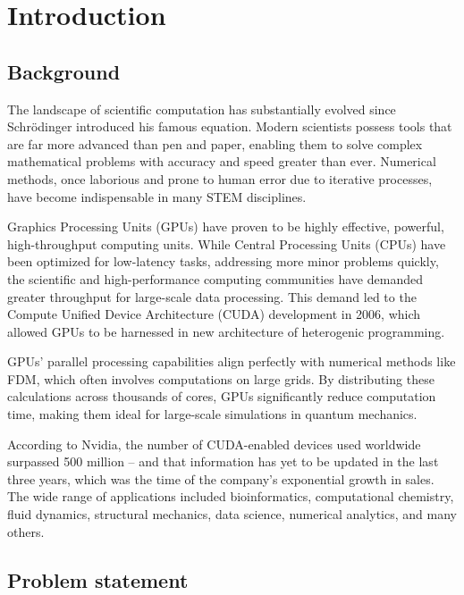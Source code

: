 \section{Introduction}

\subsection{Background}

The landscape of scientific computation has substantially evolved since Schrödinger introduced his famous equation. Modern scientists possess tools that are far more advanced than pen and paper, enabling them to solve complex mathematical problems with accuracy and speed greater than ever. Numerical methods, once laborious and prone to human error due to iterative processes, have become indispensable in many STEM disciplines.

Graphics Processing Units (GPUs) have proven to be highly effective, powerful, high-throughput computing units. While Central Processing Units (CPUs) have been optimized for low-latency tasks, addressing more minor problems quickly, the scientific and high-performance computing communities have demanded greater throughput for large-scale data processing. This demand led to the Compute Unified Device Architecture (CUDA) development in 2006, which allowed GPUs to be harnessed in new architecture of heterogenic programming.\cite{cheng2014professional}

GPUs' parallel processing capabilities align perfectly with numerical methods like FDM, which often involves computations on large grids. By distributing these calculations across thousands of cores, GPUs significantly reduce computation time, making them ideal for large-scale simulations in quantum mechanics.

According to Nvidia, the number of CUDA-enabled devices used worldwide surpassed 500 million -- and that information has yet to be updated in the last three years, which was the time of the company's exponential growth in sales. The wide range of applications included bioinformatics, computational chemistry, fluid dynamics, structural mechanics, data science, numerical analytics, and many others.\cite{cuda} 	

\subsection{Problem statement}

